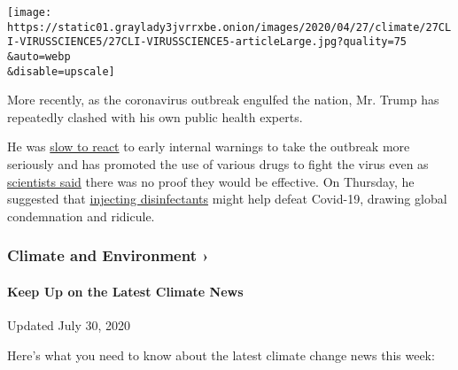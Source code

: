 \texttt{[image: https://static01.graylady3jvrrxbe.onion/images/2020/04/27/climate/27CLI-VIRUSSCIENCE5/27CLI-VIRUSSCIENCE5-articleLarge.jpg?quality=75\\\&auto=webp\\\&disable=upscale]}

More recently, as the coronavirus outbreak engulfed the nation, Mr.
Trump has repeatedly clashed with his own public health experts.

He was
\href{https://www.nytimes3xbfgragh.onion/2020/04/11/us/politics/coronavirus-trump-response.html?action=click\&module=RelatedLinks\&pgtype=Article}{slow
to react} to early internal warnings to take the outbreak more seriously
and has promoted the use of various drugs to fight the virus even as
\href{https://www.nytimes3xbfgragh.onion/2020/04/21/health/nih-covid-19-treatment.html}{scientists
said} there was no proof they would be effective. On Thursday, he
suggested that
\href{https://www.nytimes3xbfgragh.onion/2020/04/24/health/sunlight-coronavirus-trump.html}{injecting
disinfectants} might help defeat Covid-19, drawing global condemnation
and ridicule.

\href{https://www.nytimes3xbfgragh.onion/section/climate?action=click\&pgtype=Article\&state=default\&region=MAIN_CONTENT_1\&context=storylines_keepup}{}

\hypertarget{climate-and-environment-}{%
\subsubsection{Climate and Environment
›}\label{climate-and-environment-}}

\hypertarget{keep-up-on-the-latest-climate-news}{%
\paragraph{Keep Up on the Latest Climate
News}\label{keep-up-on-the-latest-climate-news}}

Updated July 30, 2020

Here's what you need to know about the latest climate change news this
week:

